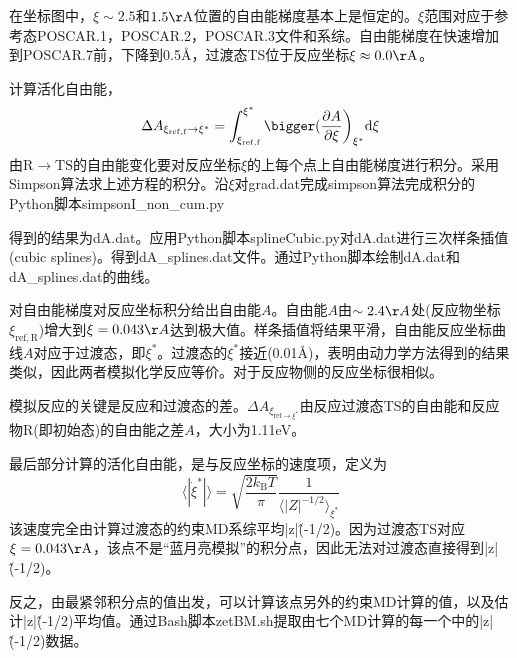 在坐标图中，$\xi\sim2.5$和$1.5\mathrm{\AA}$位置的自由能梯度基本上是恒定的。$\xi$范围对应于参考态\textrm{POSCAR.1}，\textrm{POSCAR.2}，\textrm{POSCAR.3}文件和系综。自由能梯度在快速增加到\textrm{POSCAR.7}前，下降到\textrm{0.5\AA}，过渡态\textrm{TS}位于反应坐标$\xi\approx0.0\mathrm{\AA}$。

计算活化自由能，%
\begin{displaymath}
	\Delta A_{\xi_{\mathrm{ref},\mathrm{f}}\rightarrow{\xi}^{\ast}}=\int_{\xi_{\mathrm{ref},\mathrm{f}}}^{\xi^{\ast}}\bigger(\dfrac{\partial A}{\partial\xi}\bigg)_{\xi^{\ast}}\mathrm{d}\xi
\end{displaymath}
由$\mathrm{R}\rightarrow\mathrm{TS}$的自由能变化要对反应坐标$\xi$的上每个点上自由能梯度进行积分。采用\textrm{Simpson}算法求上述方程的积分。沿$\xi$对\textrm{grad.dat}完成\textrm{simpson}算法完成积分的\textrm{Python}脚本\textrm{simpsonI\_non\_cum.py}

得到的结果为\textrm{dA.dat}。应用\textrm{Python}脚本\textrm{splineCubic.py}对\textrm{dA.dat}进行三次样条插值\textrm{(cubic splines)}。得到\textrm{dA\_splines.dat}文件。通过\textrm{Python}脚本绘制\textrm{dA.dat}和\textrm{dA\_splines.dat}的曲线。

对自由能梯度对反应坐标积分给出自由能$A$。自由能$A$由$\sim2.4\AA$处(反应物坐标$\xi_{\mathrm{ref},\mathrm{R}}$)增大到$\xi=0.043\AA$达到极大值。样条插值将结果平滑，自由能反应坐标曲线$A$对应于过渡态，即$\xi^{\ast}$。过渡态的$\xi^{\ast}$接近\textrm{(0.01\AA)}，表明由动力学方法得到的结果类似，因此两者模拟化学反应等价。对于反应物侧的反应坐标很相似。

模拟反应的关键是反应和过渡态的差。$\Delta A_{\xi_{\mathrm{ref}\rightarrow\xi^{\ast}}}$由反应过渡态\textrm{TS}的自由能和反应物\textrm{R}(即初始态)的自由能之差$A$，大小为\textrm{1.11eV}。

最后部分计算的活化自由能，是与反应坐标的速度项，定义为
\begin{displaymath}
	\langle|\dot{\xi}^{\ast}|\rangle=\sqrt{\dfrac{2k_{\mathrm{B}}T}{\pi}}\dfrac1{\langle|Z|^{-1/2}\rangle_{\xi^{\ast}}}
\end{displaymath}
该速度完全由计算过渡态的约束\textrm{MD}系综平均\textrm{|z|\^(-1/2)}。因为过渡态\textrm{TS}对应$\xi=0.043\mathrm{\AA}$，该点不是``蓝月亮模拟''的积分点，因此无法对过渡态直接得到\textrm{|z|\^(-1/2)}。

反之，由最紧邻积分点的值出发，可以计算该点另外的约束\textrm{MD}计算的值，以及估计\textrm{|z|\^(-1/2)}平均值。通过\textrm{Bash}脚本\textrm{zetBM.sh}提取由七个\textrm{MD}计算的每一个中的\textrm{|z|\^(-1/2)}数据。

